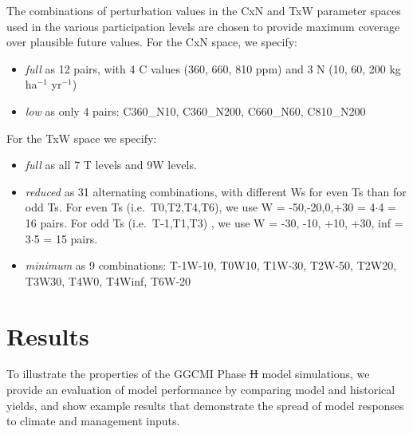 \documentclass[gmd, manuscript]{copernicus} %
\providecommand{\DIFadd}[1]{{\protect\color{blue}\uwave{#1}}} %
\providecommand{\DIFdel}[1]{{\protect\color{red}\sout{#1}}}                      %
\providecommand{\DIFaddbegin}{} %
\providecommand{\DIFaddend}{} %
\providecommand{\DIFdelbegin}{} %
\providecommand{\DIFdelend}{} %
\begin{document}
The combinations of perturbation values in the CxN and TxW parameter spaces used in the various participation levels are chosen to provide maximum coverage over plausible future values. For the CxN space, we specify:
\begin{itemize}
  \item \textit{full} as 12 pairs, with 4 C values (360, \DIFaddbegin \DIFadd{510, }\DIFaddend 660, 810 ppm) and 3 N (10, 60, 200 kg ha$^{-1}$ yr$^{-1}$)
  \item \textit{low} as only 4 pairs: C360\_N10, C360\_N200, C660\_N60, C810\_N200
\end{itemize}

For the TxW space we specify:
\begin{itemize}
  \item \textit{full} as all 7 T levels and 9W levels.
  \item \textit{reduced} as 31 alternating combinations, with different Ws for even Ts than for odd Ts. For even Ts (i.e.\ T0,T2,T4,T6), we use W = -50,-20,0,+30 = 4$\cdot$4 = 16 pairs. For odd Ts (i.e.\ T-1,T1,T3) , we use W = -30, -10, +10, +30, inf = 3$\cdot$5 = 15 pairs.
  \item \textit{minimum} as 9 combinations: T-1W-10, T0W10, T1W-30, T2W-50, T2W20, T3W30, T4W0, T4Winf, T6W-20
\end{itemize}

\section{Results}
\label{S:4}

To illustrate the properties of the GGCMI Phase \DIFdelbegin \DIFdel{II }\DIFdelend \DIFaddbegin \DIFadd{2 }\DIFaddend model simulations, we provide an evaluation of model performance by comparing model and historical yields, and show example results that demonstrate the spread of model responses to climate and management inputs. 
\end{document}
